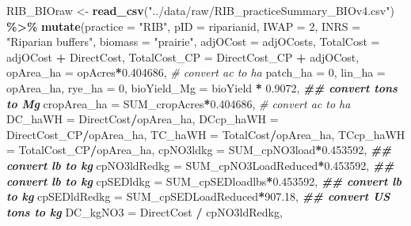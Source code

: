\documentclass[
]{article}
\newenvironment{Shaded}{\begin{snugshade}}{\end{snugshade}}
\newcommand{\AttributeTok}[1]{\textcolor[rgb]{0.13,0.29,0.53}{#1}}
\newcommand{\CommentTok}[1]{\textcolor[rgb]{0.56,0.35,0.01}{\textit{#1}}}
\newcommand{\DecValTok}[1]{\textcolor[rgb]{0.00,0.00,0.81}{#1}}
\newcommand{\DocumentationTok}[1]{\textcolor[rgb]{0.56,0.35,0.01}{\textbf{\textit{#1}}}}
\newcommand{\FloatTok}[1]{\textcolor[rgb]{0.00,0.00,0.81}{#1}}
\newcommand{\FunctionTok}[1]{\textcolor[rgb]{0.13,0.29,0.53}{\textbf{#1}}}
\newcommand{\NormalTok}[1]{#1}
\newcommand{\OtherTok}[1]{\textcolor[rgb]{0.56,0.35,0.01}{#1}}
\newcommand{\SpecialCharTok}[1]{\textcolor[rgb]{0.81,0.36,0.00}{\textbf{#1}}}
\newcommand{\StringTok}[1]{\textcolor[rgb]{0.31,0.60,0.02}{#1}}
\begin{document}
\begin{Shaded}
\begin{Highlighting}[]
\NormalTok{RIB\_BIOraw }\OtherTok{\textless{}{-}} \FunctionTok{read\_csv}\NormalTok{(}\StringTok{"../data/raw/RIB\_practiceSummary\_BIOv4.csv"}\NormalTok{) }\SpecialCharTok{\%\textgreater{}\%}
  \FunctionTok{mutate}\NormalTok{(}\AttributeTok{practice =} \StringTok{"RIB"}\NormalTok{,}
         \AttributeTok{pID =}\NormalTok{ riparianid,}
         \AttributeTok{IWAP =} \DecValTok{2}\NormalTok{,}
         \AttributeTok{INRS =} \StringTok{"Riparian buffers"}\NormalTok{,}
         \AttributeTok{biomass =} \StringTok{"prairie"}\NormalTok{,}
         \AttributeTok{adjOCost =}\NormalTok{ adjOCosts,}
         \AttributeTok{TotalCost =}\NormalTok{ adjOCost }\SpecialCharTok{+}\NormalTok{ DirectCost,}
         \AttributeTok{TotalCost\_CP =}\NormalTok{ DirectCost\_CP }\SpecialCharTok{+}\NormalTok{ adjOCost,}
         \AttributeTok{opArea\_ha =}\NormalTok{ opAcres}\SpecialCharTok{*}\FloatTok{0.404686}\NormalTok{, }\CommentTok{\# convert ac to ha}
         \AttributeTok{patch\_ha =} \DecValTok{0}\NormalTok{,}
         \AttributeTok{lin\_ha =}\NormalTok{ opArea\_ha,}
         \AttributeTok{rye\_ha =} \DecValTok{0}\NormalTok{,}
         \AttributeTok{bioYield\_Mg =}\NormalTok{ bioYield }\SpecialCharTok{*} \FloatTok{0.9072}\NormalTok{, }\DocumentationTok{\#\# convert tons to Mg}
         \AttributeTok{cropArea\_ha =}\NormalTok{ SUM\_cropAcres}\SpecialCharTok{*}\FloatTok{0.404686}\NormalTok{, }\CommentTok{\# convert ac to ha}
         \AttributeTok{DC\_haWH =}\NormalTok{ DirectCost}\SpecialCharTok{/}\NormalTok{opArea\_ha,}
         \AttributeTok{DCcp\_haWH =}\NormalTok{ DirectCost\_CP}\SpecialCharTok{/}\NormalTok{opArea\_ha,}
         \AttributeTok{TC\_haWH =}\NormalTok{ TotalCost}\SpecialCharTok{/}\NormalTok{opArea\_ha,}
         \AttributeTok{TCcp\_haWH =}\NormalTok{ TotalCost\_CP}\SpecialCharTok{/}\NormalTok{opArea\_ha,}
         \AttributeTok{cpNO3ldkg =}\NormalTok{ SUM\_cpNO3load}\SpecialCharTok{*}\FloatTok{0.453592}\NormalTok{, }\DocumentationTok{\#\# convert lb to kg}
         \AttributeTok{cpNO3ldRedkg =}\NormalTok{ SUM\_cpNO3LoadReduced}\SpecialCharTok{*}\FloatTok{0.453592}\NormalTok{, }\DocumentationTok{\#\# convert lb to kg}
         \AttributeTok{cpSEDldkg =}\NormalTok{ SUM\_cpSEDloadlbs}\SpecialCharTok{*}\FloatTok{0.453592}\NormalTok{, }\DocumentationTok{\#\# convert lb to kg}
         \AttributeTok{cpSEDldRedkg =}\NormalTok{ SUM\_cpSEDLoadReduced}\SpecialCharTok{*}\FloatTok{907.18}\NormalTok{, }\DocumentationTok{\#\# convert US tons to kg}
         \AttributeTok{DC\_kgNO3 =}\NormalTok{ DirectCost }\SpecialCharTok{/}\NormalTok{ cpNO3ldRedkg,}

\end{Highlighting}
\end{Shaded}
\end{document}
